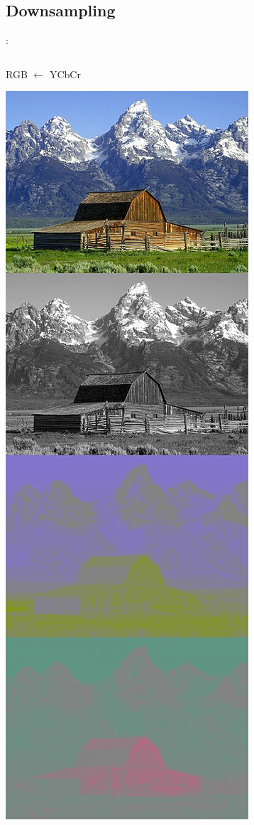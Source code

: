 \documentclass{beamer}
\begin{document}
\subsection{Downsampling}
\begin{frame}{\secname : \subsecname}

\begin{columns}
\begin{column}{0.3\textwidth}

RGB $\leftarrow$ YCbCr

\includegraphics[scale=0.1]{figures/ycbcr.jpg}


\end{column}
\end{columns}
\end{frame}
\end{document}
